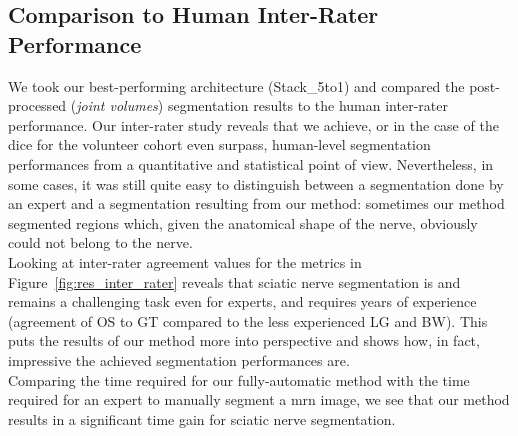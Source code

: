 \subsection{Comparison to Human Inter-Rater Performance}
We took our best-performing architecture (Stack\_5to1) and compared the post-processed (\textit{joint volumes}) segmentation results to the human inter-rater performance. Our inter-rater study reveals that we achieve, or in the case of the \acrlong{dice} for the volunteer cohort even surpass, human-level segmentation performances from a quantitative and statistical point of view. Nevertheless, in some cases, it was still quite easy to distinguish between a segmentation done by an expert and a segmentation resulting from our method: sometimes our method segmented regions which, given the anatomical shape of the nerve, obviously could not belong to the nerve.\\
Looking at inter-rater agreement values for the metrics in Figure~\ref{fig:res_inter_rater} reveals that sciatic nerve segmentation is and remains a challenging task even for experts, and requires years of experience (agreement of OS to GT compared to the less experienced LG and BW). This puts the results of our method more into perspective and shows how, in fact, impressive the achieved segmentation performances are.\\
Comparing the time required for our fully-automatic method with the time required for an expert to manually segment a \gls{mrn} image, we see that our method results in a significant time gain for sciatic nerve segmentation.\\



